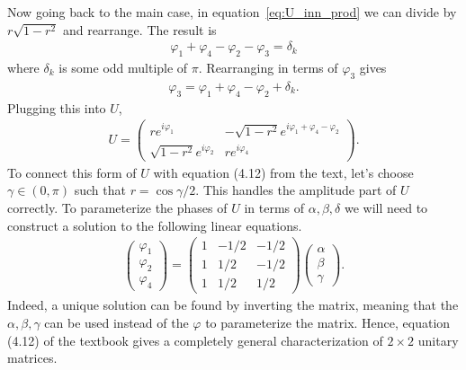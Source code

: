 \documentclass{book}
\begin{document}
    Now going back to the main case, in equation~\eqref{eq:U_inn_prod} we can divide by $r\sqrt{1-r^2}$ and rearrange. The result is
    \begin{align}
        \varphi_1 +\varphi_4 - \varphi_2 -\varphi_3 = \delta_k
    \end{align}
    where $\delta_k$ is some odd multiple of $\pi$. Rearranging in terms of $\varphi_3$ gives
    \begin{align}
        \varphi_3 = \varphi_1 + \varphi_4 - \varphi_2 + \delta_k.
    \end{align}
    Plugging this into $U$,
    \begin{align}
        U = \begin{pmatrix}
            r e^{i\varphi_1} & -\sqrt{1-r^2} e^{i\varphi_1 + \varphi_4 -\varphi_2} \\
            \sqrt{1-r^2} e^{i\varphi_2} & r e^{i\varphi_4}
        \end{pmatrix}.
    \end{align}
    To connect this form of $U$ with equation (4.12) from the text, let's choose $\gamma \in (0,\pi)$ such that $r = \cos\gamma/2$. This handles the amplitude part of $U$ correctly. To parameterize the phases of $U$ in terms of $\alpha, \beta, \delta$ we will need to construct a solution to the following linear equations.
    \begin{align}
        \begin{pmatrix}
            \varphi_1 \\
            \varphi_2 \\
            \varphi_4
        \end{pmatrix} = \begin{pmatrix}
            1 & -1/2 & -1/2 \\
            1 & 1/2 & -1/2 \\
            1 & 1/2 & 1/2 
        \end{pmatrix} \begin{pmatrix}
            \alpha \\
            \beta \\
            \gamma
        \end{pmatrix}. 
    \end{align}
    Indeed, a unique solution can be found by inverting the matrix, meaning that the $\alpha,\beta,\gamma$ can be used instead of the $\varphi$ to parameterize the matrix. Hence, equation (4.12) of the textbook gives a completely general characterization of $2\times 2$ unitary matrices. 
    
\end{document}
